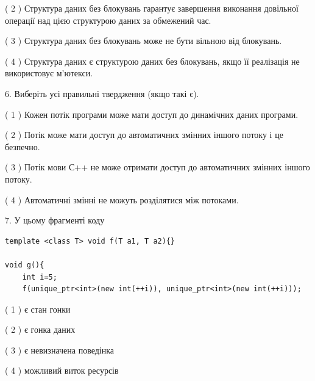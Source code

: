 \documentclass[12pt, ukrainian]{article}
\begin{document}
\begin {large}
{( 2 ) Структура даних без блокувань гарантує завершення виконання довільної операції над цією структурою даних за обмежений час.%

( 3 ) Структура даних без блокувань може не бути вільною від блокувань.%

( 4 ) Структура даних є структурою даних без блокувань, якщо її реалізація не використовує м’ютекси.%
\newpage



\vspace{5mm}
6. Виберіть усі правильні твердження (якщо такі є).\par
\vspace{2mm}

( 1 ) Кожен потік програми може мати доступ до динамічних даних програми.%

( 2 ) Потік може мати доступ до автоматичних змінних іншого потоку і це безпечно.%

( 3 ) Потік мови С++ не може отримати доступ до автоматичних змінних іншого потоку.%

( 4 ) Автоматичні змінні не можуть розділятися між потоками.%


\vspace{5mm}
7. У цьому фрагменті коду
\begin{verbatim}
template <class T> void f(T a1, T a2){}

void g(){
    int i=5;
    f(unique_ptr<int>(new int(++i)), unique_ptr<int>(new int(++i)));
\end{verbatim}

( 1 ) є стан гонки%

( 2 ) є гонка даних%

( 3 ) є невизначена поведінка%

( 4 ) можливий виток ресурсів%
}
\end {large}
\end{document}
